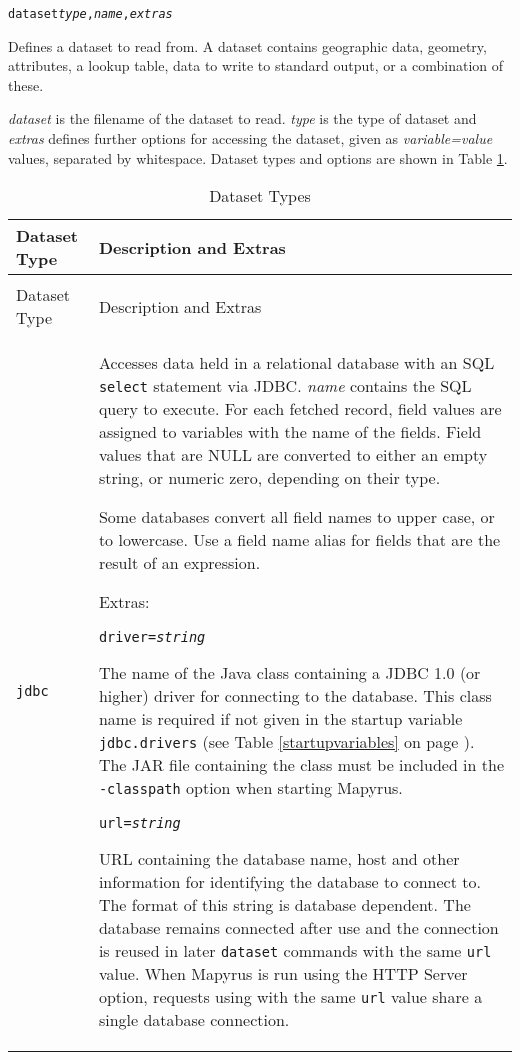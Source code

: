 \begin{alltt}
dataset \textit{type}, \textit{name}, \textit{extras}
\end{alltt}

Defines a dataset to read from.  A dataset contains geographic data,
geometry, attributes, a lookup table, data to write to standard
output, or a combination of these.

\textit{dataset} is the filename of the dataset to read.
\textit{type} is the type of dataset and
\textit{extras} defines further options for accessing the dataset, given
as \textit{variable=value} values, separated by whitespace.
Dataset types and options are shown in Table \ref{datasettypes}.


\begin{longtable}{|p{3cm}|p{10cm}|}
\hline
\label{datasettypes}
Dataset Type & Description and Extras \\
\hline
\hline
\endfirsthead
\hline
\caption{Dataset Types} \\
\endfoot

\hline
Dataset Type & Description and Extras \\
\hline
\hline
\endhead

\texttt{jdbc} &
Accesses data held in a relational database with
an SQL \texttt{select} statement via JDBC.
\textit{name} contains the SQL query to execute.
For each fetched record, field values are assigned to variables
with the name of the fields.
Field values that are NULL are converted to either an empty string,
or numeric zero, depending on their type.

Some databases convert all field names to upper case, or to lowercase.
Use a field name alias for fields that are the result of an expression.

\vspace{10pt}
Extras:

\texttt{driver=\textit{string}}

The name of the Java class containing a JDBC 1.0 (or higher)
driver for connecting to the database.
This class name is required if not given in the startup variable
\texttt{jdbc.drivers} (see Table \ref{startupvariables}
on page \pageref{startupvariables}).
The JAR file containing the class must be included in the \texttt{-classpath}
option when starting Mapyrus.

\vspace{10pt}
\texttt{url=\textit{string}}

URL containing the database name, host and other information for identifying
the database to connect to.
The format of this string is database dependent.
The database remains connected after use and the connection is reused in later
\texttt{dataset} commands with the same \texttt{url} value.
When Mapyrus is run using the HTTP Server option,
requests using with the same \texttt{url} value share a
single database connection.


\end{longtable}
